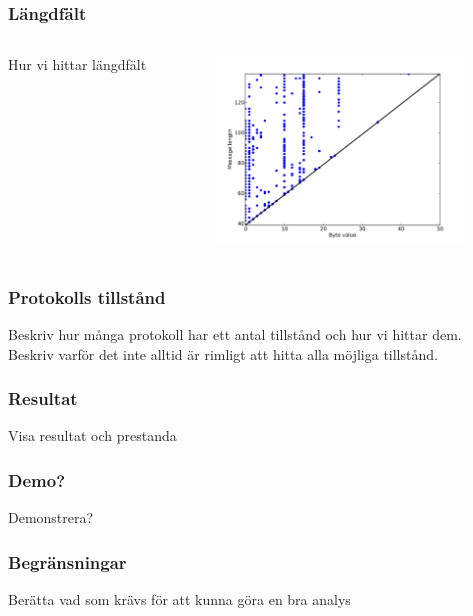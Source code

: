 \documentclass[xetex]{beamer}
\begin{document}
    \begin{frame}
        \frametitle{Längdfält}
        \begin{columns}[t]
            \begin{column}[T]{6cm}
                Hur vi hittar längdfält
            \end{column}
            \begin{column}[T]{6cm}
                \includegraphics[height=5cm]{img/length.pdf}
            \end{column}
        \end{columns}
    \end{frame}

    \begin{frame}
        \frametitle{Protokolls tillstånd}
        Beskriv hur många protokoll har ett antal tillstånd och hur vi
        hittar dem. Beskriv varför det inte alltid är rimligt att hitta
        alla möjliga tillstånd.
    \end{frame}

    \begin{frame}
        \frametitle{Resultat}
        Visa resultat och prestanda
    \end{frame}
    \begin{frame}
        \frametitle{Demo?}
        Demonstrera?
    \end{frame}

    \begin{frame}
        \frametitle{Begränsningar}
        Berätta vad som krävs för att kunna göra en bra analys
    \end{frame}
\end{document}
